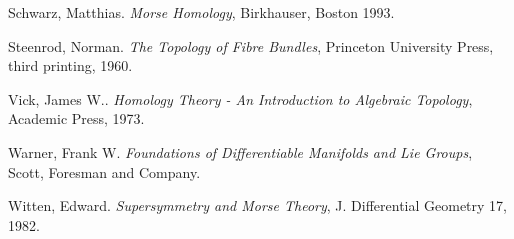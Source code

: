 \documentclass[12pt]{book}
\begin{document}
\begin{thebibliography}{9}
		Schwarz, Matthias.
		\emph{Morse Homology},
		Birkhauser, Boston
		1993.
		
		Steenrod, Norman.
		\emph{The Topology of Fibre Bundles},
		Princeton University Press, third printing, 
		1960.
		
		Vick, James W..
		\emph{Homology Theory - An Introduction to Algebraic Topology},
		Academic Press, 1973.
		
		Warner, Frank W.
		\emph{Foundations of Differentiable Manifolds and Lie Groups},
		Scott, Foresman and Company.
			
		Witten, Edward.
		\emph{Supersymmetry and Morse Theory},
		J. Differential Geometry 17,
		1982.
	\end{thebibliography}
	
\end{document}
